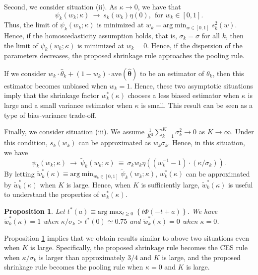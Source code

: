 \documentclass[12pt,a4paper]{article}
\newtheorem{Proposition}{Proposition}
\begin{document}
Second, we consider situation (ii). As $\kappa \to 0$, we have that
$$
\psi_k(w_k;\kappa) \ \to \ s_k(w_k) \eta(0), \ \ \text{for $w_k \in [0,1]$.}
$$
Thus, the limit of $\psi_k(w_k; \kappa)$ is minimized at $w_k = \text{arg} \min_{w \in [0,1]}  s_k^2(w)$. Hence, if the homoscedasticity assumption holds, that is, $\sigma_k = \sigma$ for all $k$, then the limit of $\psi_k(w_k;\kappa)$ is minimized at $w_k=0$. Hence, if the dispersion of the parameters decreases, the proposed shrinkage rule approaches the pooling rule.

If we consider $w_k \cdot \hat{\theta}_k + (1-w_k) \cdot \mathrm{ave}(\hat{\bm{\theta}})$ to be an estimator of $\theta_k$, then this estimator becomes unbiased when $w_k = 1$. Hence, these two asymptotic situations imply that the shrinkage factor $w_k^{\ast}(\kappa)$ chooses a less biased estimator when $\kappa$ is large and a small variance estimator when $\kappa$ is small. This result can be seen as a type of bias-variance trade-off.

Finally, we consider situation (iii). We assume $\frac{1}{K^2} \sum_{k=1}^K \sigma_k^2  \to  0$ as $K \to \infty$. Under this condition, $s_k(w_k)$ can be approximated as $w_k \sigma_k$. Hence, in this situation, we have
$$
\psi_k(w_k;\kappa) \ \to \ \tilde{\psi}_k(w_k;\kappa) \ \equiv \ \sigma_k w_k \eta \left( (w_k^{-1} - 1) \cdot (\kappa / \sigma_k) \right).
$$
By letting $\tilde{w}_k^{\ast}(\kappa) \equiv \text{arg} \min_{w_k \in [0,1]} \tilde{\psi}_k(w_k;\kappa)$, $w_k^{\ast}(\kappa)$ can be approximated by $\tilde{w}_k^{\ast}(\kappa)$ when $K$ is large. Hence, when $K$ is sufficiently large, $\tilde{w}_k^{\ast}(\kappa)$ is useful to understand the properties of $w_k^{\ast}(\kappa)$.

\begin{Proposition}\label{prop:K_asymptotics}
Let $t^{\ast}(a) \equiv \mathrm{arg} \max_{t \geq 0} \left\{ t \Phi(-t+a) \right\}$. We have $\tilde{w}_k^{\ast}(\kappa) = 1$ when  $\kappa/\sigma_k > t^{\ast}(0) \simeq 0.75$ and $\tilde{w}_k^{\ast}(\kappa) = 0$ when $\kappa = 0$.
\end{Proposition}

Proposition \ref{prop:K_asymptotics} implies that we obtain results similar to above two situations even when $K$ is large. Specifically, the proposed shrinkage rule becomes the CES rule when $\kappa / \sigma_k$ is larger than approximately $3/4$ and $K$ is large, and the proposed shrinkage rule becomes the pooling rule when $\kappa = 0$ and $K$ is large. 
\end{document}

